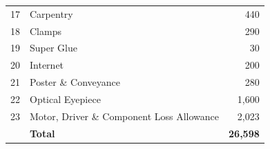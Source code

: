 \documentclass[11pt,a4paper]{article}
\begin{document}
\begin{tabularx}{\linewidth}{@{} c X r @{}}
17 & Carpentry                                                    & 440 \\
18 & Clamps                                                       & 290 \\
19 & Super Glue                                                   & 30 \\
20 & Internet                                                     & 200 \\
21 & Poster \& Conveyance                                         & 280 \\
22 & Optical Eyepiece                                             & 1,600 \\
23 & Motor, Driver \& Component Loss Allowance                    & 2,023 \\
\midrule[\heavyrulewidth]
   & \textbf{Total}                                               & \textbf{26,598} \\
\bottomrule
\end{tabularx}
\end{document}
